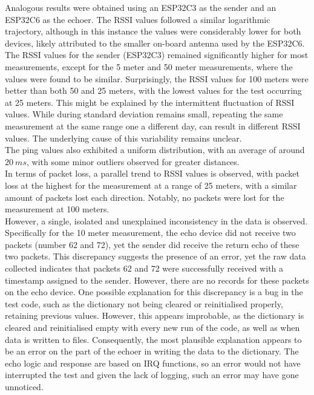 Analogous results were obtained using an ESP32C3 as the sender and an ESP32C6 as the echoer. The RSSI values followed a similar logarithmic trajectory, although in this instance the values were considerably lower for both devices, likely attributed to the smaller on-board antenna used by the ESP32C6. The RSSI values for the sender (ESP32C3) remained significantly higher for most measurements, except for the 5 meter and 50 meter measurements, where the values were found to be similar. Surprisingly, the RSSI values for 100 meters were better than both 50 and 25 meters, with the lowest values for the test occurring at 25 meters. This might be explained by the intermittent fluctuation of RSSI values. While during standard deviation remains small, repeating the same measurement at the same range one a different day, can result in different RSSI values. The underlying cause of this variability remains unclear.\\

The ping values also exhibited a uniform distribution, with an average of around $20\ ms$, with some minor outliers observed for greater distances.\\

In terms of packet loss, a parallel trend to RSSI values is observed, with packet loss at the highest for the measurement at a range of 25 meters, with a similar amount of packets lost each direction. Notably, no packets were lost for the measurement at 100 meters. \\

However, a single, isolated and unexplained inconsistency in the data is observed. Specifically for the 10 meter measurement, the echo device did not receive two packets (number 62 and 72), yet the sender did receive the return echo of these two packets. This discrepancy suggests the presence of an error, yet the raw data collected indicates that packets 62 and 72 were successfully received with a timestamp assigned to the sender. However, there are no records for these packets on the echo device. One possible explanation for this discrepancy is a bug in the test code, such as the dictionary not being cleared or reinitialised properly, retaining previous values. However, this appears improbable, as the dictionary is cleared and reinitialised empty with every new run of the code, as well as when data is written to files. Consequently, the most plausible explanation appears to be an error on the part of the echoer in writing the data to the dictionary. The echo logic and response are based on IRQ functions, so an error would not have interrupted the test and given the lack of logging, such an error may have gone unnoticed. 
\newpage

